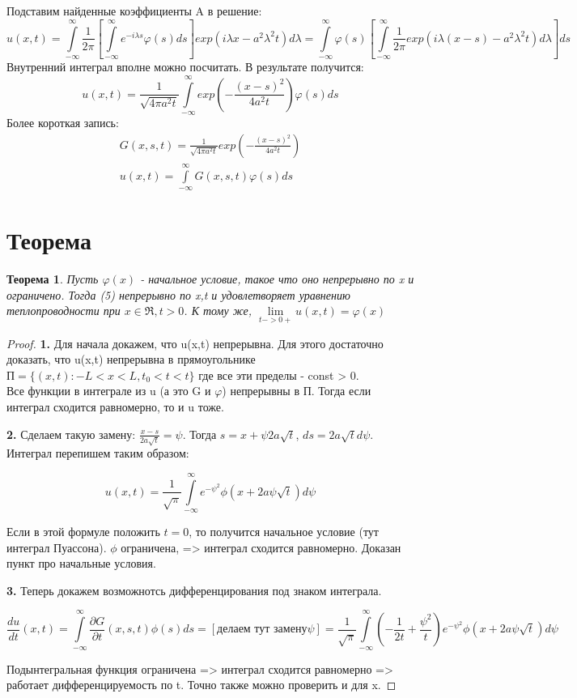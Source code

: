 \documentclass[11pt,a4paper, fqlen]{article}
\newtheorem*{thdef}{Теорема}
\begin{document}
	Подставим найденные коэффициенты A в решение:
	$$
	u(x,t) = \int \limits_{-\infty}^{\infty} \frac{1}{2\pi} \left[\int \limits_{-\infty}^{\infty} e^{-i \lambda s} \varphi(s) ds \right] exp(i \lambda x - a^2 \lambda^2 t) d\lambda = 
	\int \limits_{-\infty}^{\infty} \varphi(s) \left[\int \limits_{-\infty}^{\infty} \frac{1}{2\pi} exp(i \lambda (x-s) - a^2 \lambda^2 t) d\lambda \right] ds
	$$
	Внутренний интеграл вполне можно посчитать. В результате получится:
	$$
	u(x,t) = \frac{1}{\sqrt{4\pi a^2 t}} \int \limits_{-\infty}^{\infty} exp(-\frac{(x-s)^2}{4a^2t}) \varphi(s)ds
	$$
	Более короткая запись:
	\begin{gather}
	G(x,s,t) = \frac{1}{\sqrt{4\pi a^2 t}} exp(-\frac{(x-s)^2}{4a^2t}) \\	
	u(x,t) = \int \limits_{-\infty}^{\infty} G(x,s,t) \varphi(s) ds
	\end{gather}
	
	\section{Теорема}
	\begin{thdef}
		Пусть $\varphi(x)$ - начальное условие, такое что оно непрерывно по x и ограничено. Тогда (5) непрерывно по x,t и удовлетворяет уравнению теплопроводности при $x \in \Re, t>0$. К тому же, $\lim\limits_{t->0+} u(x,t) = \varphi(x)$
	\end{thdef}
	
	\begin{proof}
		\textbf{1.} Для начала докажем, что u(x,t) непрерывна. Для этого достаточно доказать, что u(x,t) непрерывна в прямоугольнике $П = \{(x,t): -L < x < L, t_0 < t < t\}$ где все эти пределы - const > 0. \\
		Все функции в интеграле из u (а это G и $\varphi$) непрерывны в П. Тогда если интеграл сходится равномерно, то и u тоже.
		
		\textbf{2.} Сделаем такую замену: $\frac{x-s}{2a\sqrt{t}} = \psi$. Тогда $s = x + \psi 2 a \sqrt{t}$, $ds = 2a\sqrt{t}d\psi$. Интеграл перепишем таким образом:
		
		$$
		u(x,t) = \frac{1}{\sqrt{\pi}} \int \limits_{-\infty}^{\infty} e^{-\psi^2} \phi(x+2a\psi \sqrt{t}) d\psi
		$$
		
		Если в этой формуле положить $t = 0$, то получится начальное условие (тут интеграл Пуассона). $\phi$ ограничена, => интеграл сходится равномерно. Доказан пункт про начальные условия.
		
		\textbf{3.} Теперь докажем возможнотсь дифференцирования под знаком интеграла.
		
		$$
		\frac{du}{dt} (x,t) = \int \limits_{-\infty}^{\infty} \frac{\partial G}{\partial t}(x,s,t) \phi(s) ds = [\text{делаем тут замену} \psi] = \frac{1}{\sqrt{\pi}} \int \limits_{-\infty}^{\infty} (-\frac{1}{2t} + \frac{\psi^2}{t})e^{-\psi^2} \phi(x+2a\psi \sqrt{t}) d\psi
		$$
		
		Подынтегральная функция ограничена => интеграл сходится равномерно => работает дифференцируемость по t. Точно также можно проверить и для x.
	\end{proof}
	
\end{document}
